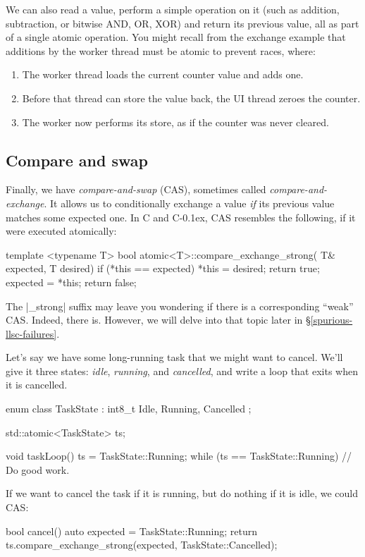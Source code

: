 \documentclass[fontsize=10pt, oneside]{scrartcl}
\newcommand{\cplusplus}[1]{C\kern-0.1ex\raisebox{0.15ex}{\texttt{++}}}
\newcommand{\clang}[1]{C}
\newcommand{\introduce}[1]{\textit{#1}}
\newcommand{\secref}[1]{\hyperref[#1]{\textsc{\S}\ref*{#1}}}
\begin{document}
We can also read a value,
perform a simple operation on it (such as addition, subtraction,
or bitwise \textsc{AND}, \textsc{OR}, \textsc{XOR}) and return its previous value,
all as part of a single atomic operation.
You might recall from the exchange example that additions by the worker thread must be atomic to prevent races, where:
\begin{enumerate}
  \item The worker thread loads the current counter value and adds one.
  \item Before that thread can store the value back,
        the \textsc{UI} thread zeroes the counter.
  \item The worker now performs its store, as if the counter was never cleared.
\end{enumerate}

\subsection{Compare and swap}
\label{cas}

Finally, we have \introduce{compare-and-swap} (\textsc{CAS}),
sometimes called \introduce{compare-and-exchange}.
It allows us to conditionally exchange a value \emph{if} its previous value matches some expected one.
In \clang{} and \cplusplus{}, \textsc{CAS} resembles the following,
if it were executed atomically:
\begin{cppcode}
template <typename T>
bool atomic<T>::compare_exchange_strong(
    T& expected, T desired)
{
    if (*this == expected) {
        *this = desired;
        return true;
    }
    expected = *this;
    return false;
}
\end{cppcode}

\begin{samepage}
\noindent The \cpp|_strong| suffix may leave you wondering if there is a corresponding ``weak'' \textsc{CAS}.
Indeed, there is. However, we will delve into that topic later in \secref{spurious-llsc-failures}.
\end{samepage}

Let's say we have some long-running task that we might want to cancel.
We'll give it three states: \textit{idle}, \textit{running},
and \textit{cancelled}, and write a loop that exits when it is cancelled.
\begin{cppcode}
enum class TaskState : int8_t {
    Idle, Running, Cancelled
};

std::atomic<TaskState> ts;

void taskLoop()
{
    ts = TaskState::Running;
    while (ts == TaskState::Running) {
      // Do good work.
    }
}
\end{cppcode}
If we want to cancel the task if it is running, but do nothing if it is idle,
we could \textsc{CAS}:
\begin{cppcode}
bool cancel()
{
    auto expected = TaskState::Running;
    return ts.compare_exchange_strong(expected, TaskState::Cancelled);
}
\end{cppcode}
\end{document}
